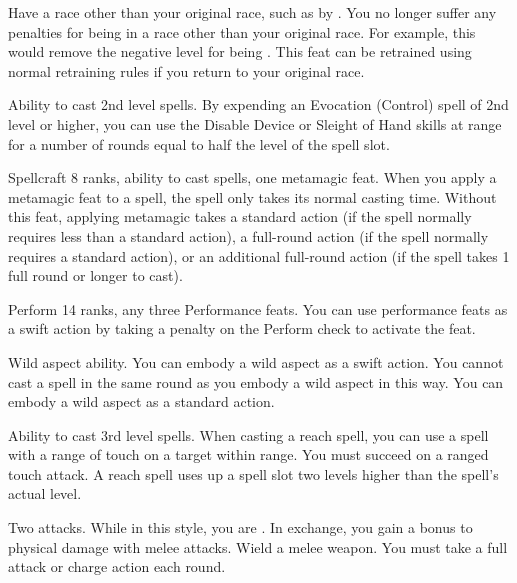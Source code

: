 \label{Racial Acclimation}
\featpre Have a race other than your original race, such as by .
\featben You no longer suffer any penalties for being in a race other than your original race.
For example, this would remove the negative level for being .
This feat can be retrained using normal retraining rules if you return to your original race.

\featpre Ability to cast 2nd level spells.
\featben By expending an Evocation (Control) spell of 2nd level or higher, you can use the Disable Device or Sleight of Hand skills at \rngclose range for a number of rounds equal to half the level of the spell slot.

\featpres
Spellcraft 8 ranks, ability to cast spells, one metamagic feat.
\featben When you apply a metamagic feat to a spell, the spell only takes its normal casting time.
Without this feat, applying metamagic takes a standard action (if the spell normally requires less than a standard action), a full-round action (if the spell normally requires a standard action), or an additional full-round action (if the spell takes 1 full round or longer to cast).

\featpre Perform 14 ranks, any three Performance feats.
\featben You can use performance feats as a swift action by taking a  penalty on the Perform check to activate the feat.

\featpre Wild aspect ability.
\featben You can embody a wild aspect as a swift action.
You cannot cast a spell in the same round as you embody a wild aspect in this way.
You can embody a wild aspect as a standard action.

\featpre Ability to cast 3rd level spells.
\featben When casting a reach spell, you can use a spell with a range of touch on a target within \rngclose range.
You must succeed on a ranged touch attack.
A reach spell uses up a spell slot two levels higher than the spell's actual level.

\featpre Two attacks.
\featben While in this style, you are .
In exchange, you gain a  bonus to physical damage with melee attacks.
\stylereq Wield a melee weapon.
You must take a full attack or charge action each round.

